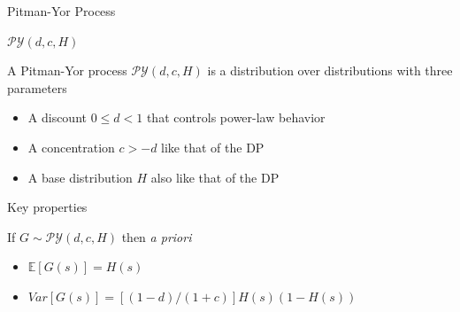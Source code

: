 \documentclass{beamer}
\newcommand{\G}{\mathcal{G}}
\newcommand{\PY}{\mathcal{P}\mathcal{Y}}
\begin{document}
\begin{frame}[t]{Pitman-Yor Process \cite{Pitman1997}}

\begin{block}{$\PY(d,c,H)$}

 A Pitman-Yor process $\PY(d,c,H)$ is a distribution over distributions with three parameters

\begin{itemize}
	\item A discount $ 0 \le d < 1 $ that controls power-law behavior
	\item A concentration $c > -d$ like that of the DP
	\item A base distribution $H$ also like that of the DP
\end{itemize}

\end{block}

\begin{block}{Key properties}

If $G\sim\PY(d,c,H)$ then {\em a priori}
	\begin{itemize}
		\item $\mathbb{E}[G(s)] = H(s)$
		\item $Var[G(s)] = [(1-d) / (1 + c)] H(s)(1-H(s))$
	\end{itemize}
\end{block}
\end{frame}

%
%	
	
\end{document}
